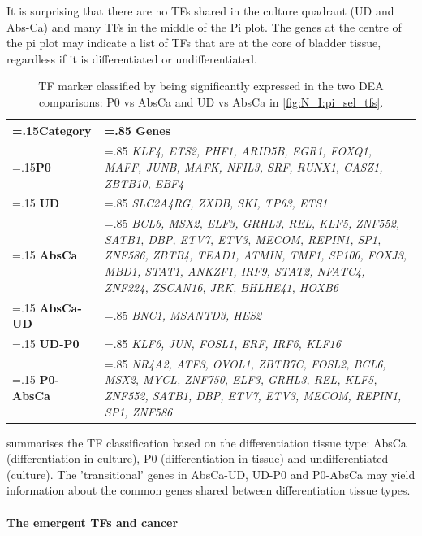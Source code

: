 It is surprising that there are no TFs shared in the culture quadrant (UD and Abs-Ca) and many TFs in the middle of the Pi plot. The genes at the centre of the pi plot may indicate a list of TFs that are at the core of bladder tissue, regardless if it is differentiated or undifferentiated.

\begin{table}[H]
  \centering
  \begin{tabularx}{\textwidth}{>{\hsize=.15\hsize}X|>{\hsize=.85\hsize}X}
    \toprule
    \textbf{Category} & \textbf{Genes} \\
    \midrule
    \textbf{P0} & \textit{KLF4, ETS2, PHF1, ARID5B, EGR1, FOXQ1, MAFF, JUNB, MAFK, NFIL3, SRF, RUNX1, CASZ1, ZBTB10, EBF4} \\
    \midrule
    \textbf{UD} & \textit{SLC2A4RG, ZXDB, SKI, TP63, ETS1} \\
    \midrule
    \textbf{AbsCa} & \textit{BCL6, MSX2, ELF3, GRHL3, REL, KLF5, ZNF552, SATB1, DBP, ETV7, ETV3, MECOM, REPIN1, SP1, ZNF586, ZBTB4, TEAD1, ATMIN, TMF1, SP100, FOXJ3, MBD1, STAT1, ANKZF1, IRF9, STAT2, NFATC4, ZNF224, ZSCAN16, JRK, BHLHE41, HOXB6} \\
    \midrule
    \textbf{AbsCa-UD} & \textit{BNC1, MSANTD3, HES2} \\
    \midrule
    \textbf{UD-P0} & \textit{KLF6, JUN, FOSL1, ERF, IRF6, KLF16} \\
    \midrule
    \textbf{P0-AbsCa} & \textit{NR4A2, ATF3, OVOL1, ZBTB7C, FOSL2, BCL6, MSX2, MYCL, ZNF750, ELF3, GRHL3, REL, KLF5, ZNF552, SATB1, DBP, ETV7, ETV3, MECOM, REPIN1, SP1, ZNF586} \\
    \bottomrule
  \end{tabularx}
  \caption{TF marker classified by being significantly expressed in the two DEA comparisons: P0 vs AbsCa and UD vs AbsCa in \cref{fig:N_I:pi_sel_tfs}.} 
  \label{tab:N_I:markers_diff}
\end{table}

 summarises the TF classification based on the differentiation tissue type: AbsCa (differentiation in culture), P0 (differentiation in tissue) and undifferentiated (culture). The 'transitional' genes in AbsCa-UD, UD-P0 and P0-AbsCa may yield information about the common genes shared between differentiation tissue types.


\paragraph*{The emergent TFs and cancer} \label{s:N_I:sel_tfs_cancer}


